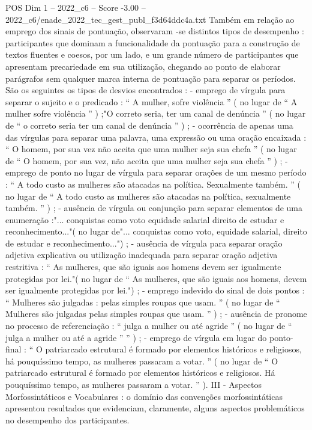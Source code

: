 \begin{textsample}{POS Dim 1 – 2022\_c6 – Score -3.00 – 2022\_c6/enade\_2022\_tec\_gest\_publ\_f3d64ddc4a.txt}
Também em relação ao emprego dos sinais de pontuação, observaram -se distintos tipos de desempenho : participantes que dominam a funcionalidade da pontuação para a construção de textos fluentes e coesos, por um lado, e um grande número de participantes que apresentam precariedade em sua utilização, chegando ao ponto de elaborar parágrafos sem qualquer marca interna de pontuação para separar os períodos.
São os seguintes os tipos de desvios encontrados : - emprego de vírgula para separar o sujeito e o predicado : “ A mulher, sofre violência ” ( no lugar de “ A mulher sofre violência ” ) ;"O correto seria, ter um canal de denúncia ” ( no lugar de “ o correto seria ter um canal de denúncia ” ) ; - ocorrência de apenas uma das vírgulas para separar uma palavra, uma expressão ou uma oração encaixada : “ O homem, por sua vez não aceita que uma mulher seja sua chefa ” ( no lugar de “ O homem, por sua vez, não aceita que uma mulher seja sua chefa ” ) ; - emprego de ponto no lugar de vírgula para separar orações de um mesmo período : “ A todo custo as mulheres são atacadas na política.
Sexualmente também. ” ( no lugar de “ A todo custo as mulheres são atacadas na política, sexualmente também. ” ) ; - ausência de vírgula ou conjunção para separar elementos de uma enumeração :"... conquistas como voto equidade salarial direito de estudar e reconhecimento..."( no lugar de"... conquistas como voto, equidade salarial, direito de estudar e reconhecimento...") ; - ausência de vírgula para separar oração adjetiva explicativa ou utilização inadequada para separar oração adjetiva restritiva : “ As mulheres, que são iguais aos homens devem ser igualmente protegidas por lei."( no lugar de “ As mulheres, que são iguais aos homens, devem ser igualmente protegidas por lei.") ; - emprego indevido do sinal de dois pontos : “ Mulheres são julgadas : pelas simples roupas que usam. ” ( no lugar de “ Mulheres são julgadas pelas simples roupas que usam. ” ) ; - ausência de pronome no processo de referenciação : “ julga a mulher ou até agride ” ( no lugar de “ julga a mulher ou até a agride ” ” ) ; - emprego de vírgula em lugar do ponto-final : “ O patriarcado estrutural é formado por elementos históricos e religiosos, há pouquíssimo tempo, as mulheres passaram a votar. ” ( no lugar de “ O patriarcado estrutural é formado por elementos históricos e religiosos.
Há pouquíssimo tempo, as mulheres passaram a votar. ” ).
III - Aspectos Morfossintáticos e Vocabulares : o domínio das convenções morfossintáticas apresentou resultados que evidenciam, claramente, alguns aspectos problemáticos no desempenho dos participantes.

\end{textsample}
